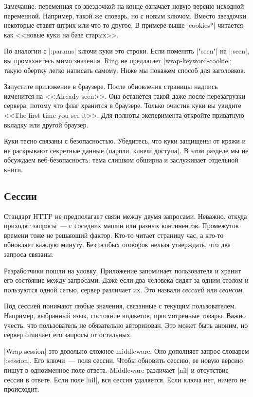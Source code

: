 Замечание: переменная со звездочкой на конце означает новую версию
исходной переменной. Например, такой же словарь, но с новым ключом. Вместо
звездочки некоторые ставят штрих или что-то другое. В примере выше
\spverb|cookies*| читается как <<новые куки на базе старых>>.

По аналогии с \spverb|:params| ключи куки это строки. Если поменять
\spverb|"seen"| на \spverb|:seen|, вы промахнетесь мимо значения. Ring не
предлагает \spverb|wrap-keyword-cookie|; такую обертку легко написать
самому. Ниже мы покажем способ для заголовков.

Запустите приложение в браузере. После обновления страницы надпись изменится на
<<Already seen>>. Она останется такой даже после перезагрузки сервера, потому
что флаг хранится в браузере. Только очистив куки вы увидите <<The first time
you see it>>. Для полноты эксперимента откройте приватную вкладку или другой
браузер.

Куки тесно связаны с безопасностью. Убедитесь, что куки защищены от кражи и не
раскрывают секретные данные (пароли, ключи доступа). В этом разделе мы не
обсуждаем веб-безопасность: тема слишком обширна и заслуживает отдельной книги.

\subsection{Сессии}

Стандарт HTTP не предполагает связи между двумя запросами. Неважно, откуда
приходят запросы~--- с соседних машин или разных континентов. Промежуток времени
тоже не решающий фактор. Кто-то читает страницу час, а кто-то обновляет каждую
минуту. Без особых оговорок нельзя утверждать, что два запроса связаны.

Разработчики пошли на уловку. Приложение запоминает пользователя и хранит его
состояние между запросами. Даже если два человека сидят за одним столом и
пользуются одной сетью, сервер различает их. Это назвали \emph{сессией} или
\emph{сеансом}.

Под сессией понимают любые значения, связанные с текущим
пользователем. Например, выбранный язык, состояние виджетов, просмотренные
товары. Важно учесть, что пользователь не обязательно авторизован. Это может
быть аноним, но сервер отличает его запросы от остальных.

\spverb|Wrap-session| это довольно сложное middleware. Оно дополняет запрос
словарем \spverb|:session|. Его ключи~--- поля сессии. Чтобы обновить сессию, ее
новую версию пишут в одноименное поле ответа. Middleware различает \spverb|nil|
и отсутствие сессии в ответе. Если поле \spverb|nil|, вся сессия удаляется. Если
ключа нет, ничего не происходит.

